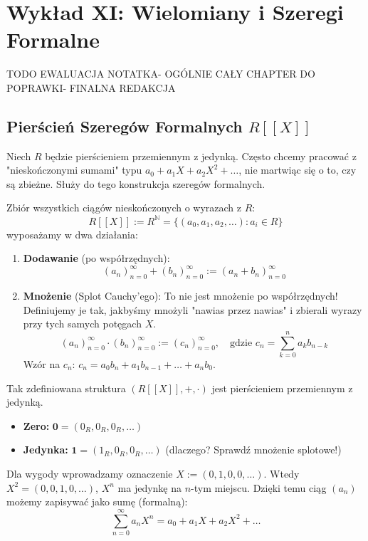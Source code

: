 \chapter{Wykład XI: Wielomiany i Szeregi Formalne}

TODO EWALUACJA NOTATKA- OGÓLNIE CAŁY CHAPTER DO POPRAWKI- FINALNA REDAKCJA

\section{Pierścień Szeregów Formalnych $R[[X]]$}

Niech $R$ będzie pierścieniem przemiennym z jedynką. Często chcemy pracować z "nieskończonymi sumami" typu $a_0 + a_1X + a_2X^2 + \dots$, nie martwiąc się o to, czy są zbieżne. Służy do tego konstrukcja szeregów formalnych.

\begin{definition}
    Zbiór wszystkich ciągów nieskończonych o wyrazach z $R$:
    \[ R[[X]] := R^{\mathbb{N}} = \{ (a_0, a_1, a_2, \dots) : a_i \in R \} \]
    wyposażamy w dwa działania:
    \begin{enumerate}
        \item \textbf{Dodawanie} (po współrzędnych):
        \[ (a_n)_{n=0}^\infty + (b_n)_{n=0}^\infty := (a_n + b_n)_{n=0}^\infty \]
        \item \textbf{Mnożenie} (Splot Cauchy'ego):
        To nie jest mnożenie po współrzędnych! Definiujemy je tak, jakbyśmy mnożyli "nawias przez nawias" i zbierali wyrazy przy tych samych potęgach $X$.
        \[ (a_n)_{n=0}^\infty \cdot (b_n)_{n=0}^\infty := (c_n)_{n=0}^\infty, \quad \text{gdzie } c_n = \sum_{k=0}^n a_k b_{n-k} \]
        Wzór na $c_n$: $c_n = a_0b_n + a_1b_{n-1} + \dots + a_nb_0$.
    \end{enumerate}
    Tak zdefiniowana struktura $(R[[X]], +, \cdot)$ jest pierścieniem przemiennym z jedynką.
    \begin{itemize}
        \item \textbf{Zero:} $\mathbf{0} = (0_{\scriptscriptstyle R}, 0_{\scriptscriptstyle R}, 0_{\scriptscriptstyle R}, \dots)$
        \item \textbf{Jedynka:} $\mathbf{1} = (1_{\scriptscriptstyle R}, 0_{\scriptscriptstyle R}, 0_{\scriptscriptstyle R}, \dots)$ (dlaczego? Sprawdź mnożenie splotowe!)
    \end{itemize}
\end{definition}

\begin{remark}
    Dla wygody wprowadzamy oznaczenie $X := (0, 1, 0, 0, \dots)$.
    Wtedy $X^2 = (0, 0, 1, 0, \dots)$, $X^n$ ma jedynkę na $n$-tym miejscu.
    Dzięki temu ciąg $(a_n)$ możemy zapisywać jako sumę (formalną):
    \[ \sum_{n=0}^\infty a_n X^n = a_0 + a_1X + a_2X^2 + \dots \]
\end{remark}

